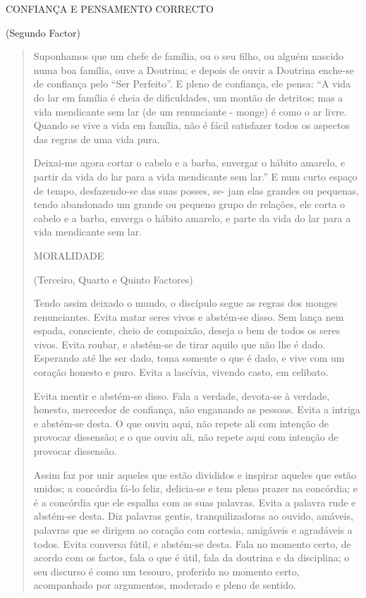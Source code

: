 CONFIANÇA E PENSAMENTO CORRECTO

(Segundo Factor)

\begin{quote}
Suponhamos que um chefe de família, ou o seu filho, ou alguém nascido numa boa família, ouve a Doutrina; e depois de ouvir a Doutrina enche-se de confiança pelo ``Ser Perfeito''. E pleno de confiança, ele pensa: ``A vida do lar em família é cheia de dificuldades, um montão de detritos; mas a vida mendicante sem lar (de um renunciante - monge) é como o ar livre. Quando se vive a vida em família, não é fácil satisfazer todos os aspectos das regras de uma vida pura.

Deixai-me agora cortar o cabelo e a barba, envergar o hábito amarelo, e partir da vida do lar para a vida mendicante sem lar.'' E num curto espaço de tempo, desfazendo-se das suas posses, se- jam elas grandes ou pequenas, tendo abandonado um grande ou pequeno grupo de relações, ele corta o cabelo e a barba, enverga o hábito amarelo, e parte da vida do lar para a vida mendicante sem lar.

MORALIDADE

(Terceiro, Quarto e Quinto Factores)

Tendo assim deixado o mundo, o discípulo segue as regras dos monges renunciantes. Evita matar seres vivos e abstém-se disso. Sem lança nem espada, consciente, cheio de compaixão, deseja o bem de todos os seres vivos. Evita roubar, e abstém-se de tirar aquilo que não lhe é dado. Esperando até lhe ser dado, toma somente o que é dado, e vive com um coração honesto e puro. Evita a lascívia, vivendo casto, em celibato.

Evita mentir e abstém-se disso. Fala a verdade, devota-se à verdade, honesto, merecedor de confiança, não enganando as pessoas. Evita a intriga e abstém-se desta. O que ouviu aqui, não repete ali com intenção de provocar dissensão; e o que ouviu ali, não repete aqui com intenção de provocar dissensão.

Assim faz por unir aqueles que estão divididos e inspirar aqueles que estão unidos; a concórdia fá-lo feliz, delicia-se e tem pleno prazer na concórdia; e é a concórdia que ele espalha com as suas palavras. Evita a palavra rude e abstém-se desta. Diz palavras gentis, tranquilizadoras ao ouvido, amáveis, palavras que se dirigem ao coração com cortesia, amigáveis e agradáveis a todos. Evita conversa fútil, e abstém-se desta. Fala no momento certo, de acordo com os factos, fala o que é útil, fala da doutrina e da disciplina; o seu discurso é como um tesouro, proferido no momento certo, acompanhado por argumentos, moderado e pleno de sentido.


\end{quote}
